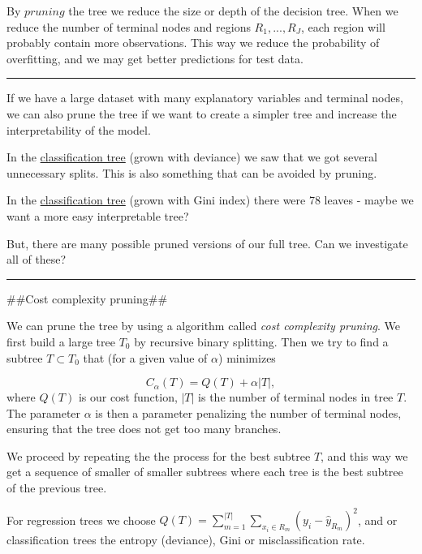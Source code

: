 \documentclass[]{article}
\begin{document}
By \(pruning\) the tree we reduce the size or depth of the decision
tree. When we reduce the number of terminal nodes and regions
\(R_1,...,R_J\), each region will probably contain more observations.
This way we reduce the probability of overfitting, and we may get better
predictions for test data.

\begin{center}\rule{0.5\linewidth}{\linethickness}\end{center}

If we have a large dataset with many explanatory variables and terminal
nodes, we can also prune the tree if we want to create a simpler tree
and increase the interpretability of the model.

In the \protect\hyperlink{classtree2}{classification tree} (grown with
deviance) we saw that we got several unnecessary splits. This is also
something that can be avoided by pruning.

In the \protect\hyperlink{classtree3}{classification tree} (grown with
Gini index) there were 78 leaves - maybe we want a more easy
interpretable tree?

But, there are many possible pruned versions of our full tree. Can we
investigate all of these?

\begin{center}\rule{0.5\linewidth}{\linethickness}\end{center}

\#\#Cost complexity pruning\#\#

We can prune the tree by using a algorithm called \emph{cost complexity
pruning}. We first build a large tree \(T_0\) by recursive binary
splitting. Then we try to find a subtree \(T\subset T_0\) that (for a
given value of \(\alpha\)) minimizes

\[
C_{\alpha}(T)=Q(T)+\alpha |T|,
\] where \(Q(T)\) is our cost function, \(|T|\) is the number of
terminal nodes in tree \(T\). The parameter \(\alpha\) is then a
parameter penalizing the number of terminal nodes, ensuring that the
tree does not get too many branches.

We proceed by repeating the the process for the best subtree \(T\), and
this way we get a sequence of smaller of smaller subtrees where each
tree is the best subtree of the previous tree.

For regression trees we choose
\(Q(T)=\sum_{m=1}^{|T|}\sum_{x_i\in R_m}(y_i - \hat{y}_{R_m})^2\), and
or classification trees the entropy (deviance), Gini or
misclassification rate.
\end{document}
